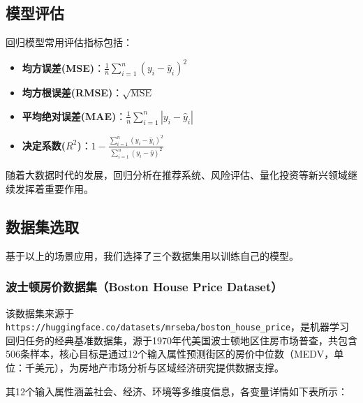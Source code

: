\subsection{模型评估}

回归模型常用评估指标包括：
\begin{itemize}
    \item \textbf{均方误差(MSE)}：$\frac{1}{n}\sum_{i=1}^n(y_i - \hat{y}_i)^2$
    \item \textbf{均方根误差(RMSE)}：$\sqrt{\text{MSE}}$
    \item \textbf{平均绝对误差(MAE)}：$\frac{1}{n}\sum_{i=1}^n|y_i - \hat{y}_i|$
    \item \textbf{决定系数($R^2$)}：$1 - \frac{\sum_{i=1}^n(y_i - \hat{y}_i)^2}{\sum_{i=1}^n(y_i - \bar{y})^2}$
\end{itemize}

随着大数据时代的发展，回归分析在推荐系统、风险评估、量化投资等新兴领域继续发挥着重要作用。
\subsection{数据集选取}
基于以上的场景应用，我们选择了三个数据集用以训练自己的模型。
\subsubsection{波士顿房价数据集（Boston House Price Dataset）}
该数据集来源于\texttt{https://huggingface.co/datasets/mrseba/boston\_house\_price}，是机器学习回归任务的经典基准数据集，源于1970年代美国波士顿地区住房市场普查，共包含506条样本，核心目标是通过12个输入属性预测街区的房价中位数（MEDV，单位：千美元），为房地产市场分析与区域经济研究提供数据支撑。

其12个输入属性涵盖社会、经济、环境等多维度信息，各变量详情如下表所示：


